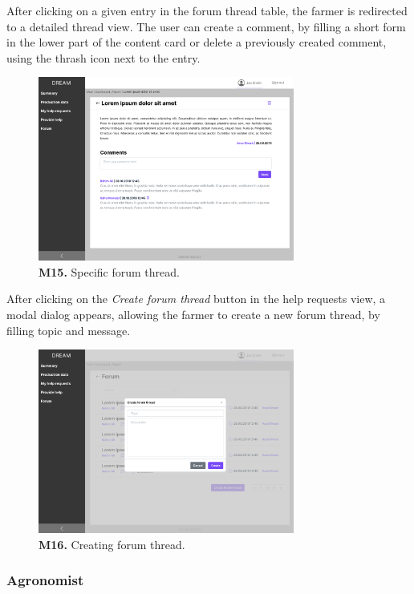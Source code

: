     After clicking on a given entry in the forum thread table, the farmer is redirected to a detailed thread view. The user can create a comment, by filling a short form in the lower part of the content card or delete a previously created comment, using the thrash icon next to the entry.
    \begin{figure}[H]
        \centering
        \includegraphics[width=0.75\textwidth]{mockups/Farmer_Dashboard_Forum_Thread.png}
        \caption{\textbf{M15.} Specific forum thread.}
    \end{figure}
    
    After clicking on the \textit{Create forum thread} button in the help requests view, a modal dialog appears, allowing the farmer to create a new forum thread, by filling topic and message.
    \begin{figure}[H]
        \centering
        \includegraphics[width=0.75\textwidth]{mockups/Farmer_Dashboard_Forum_Create thread.png}
        \caption{\textbf{M16.} Creating forum thread.}
    \end{figure}
    
    
    \subsubsection{Agronomist}
    
